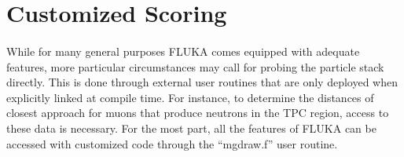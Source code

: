 \section{Customized Scoring}

\paragraph{}
While for many general purposes FLUKA comes equipped with adequate features, more particular circumstances may call for probing the particle stack directly. This is done through external user routines that are only deployed when explicitly linked at compile time. For instance, to determine the distances of closest approach for muons that produce neutrons in the TPC region, access to these data is necessary. For the most part, all the features of FLUKA can be accessed with customized code through the ``mgdraw.f'' user routine.